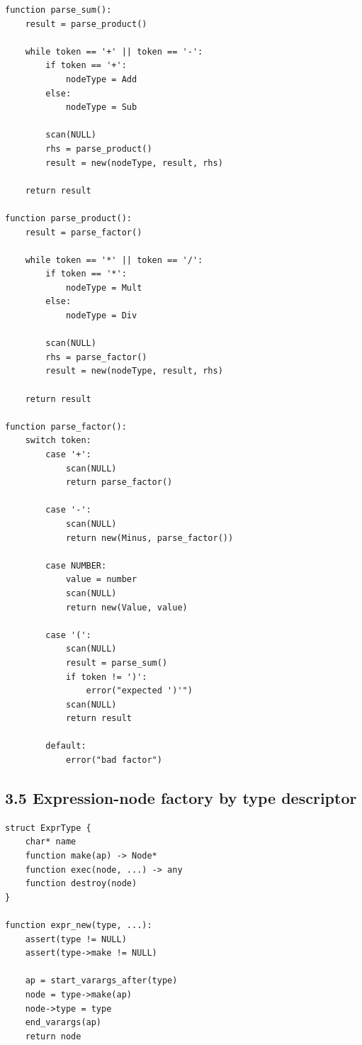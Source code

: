 \documentclass[11pt]{article}
\begin{document}
\begin{verbatim}
function parse_sum():
    result = parse_product()

    while token == '+' || token == '-':
        if token == '+':
            nodeType = Add
        else:
            nodeType = Sub

        scan(NULL)
        rhs = parse_product()
        result = new(nodeType, result, rhs)

    return result

function parse_product():
    result = parse_factor()

    while token == '*' || token == '/':
        if token == '*':
            nodeType = Mult
        else:
            nodeType = Div

        scan(NULL)
        rhs = parse_factor()
        result = new(nodeType, result, rhs)

    return result

function parse_factor():
    switch token:
        case '+':
            scan(NULL)
            return parse_factor()

        case '-':
            scan(NULL)
            return new(Minus, parse_factor())

        case NUMBER:
            value = number
            scan(NULL)
            return new(Value, value)

        case '(':
            scan(NULL)
            result = parse_sum()
            if token != ')':
                error("expected ')'")
            scan(NULL)
            return result

        default:
            error("bad factor")
\end{verbatim}

\subsection{3.5 Expression-node factory by type
descriptor}\label{expression-node-factory-by-type-descriptor}

\begin{verbatim}
struct ExprType {
    char* name
    function make(ap) -> Node*
    function exec(node, ...) -> any
    function destroy(node)
}

function expr_new(type, ...):
    assert(type != NULL)
    assert(type->make != NULL)

    ap = start_varargs_after(type)
    node = type->make(ap)
    node->type = type
    end_varargs(ap)
    return node
\end{verbatim}
\end{document}
